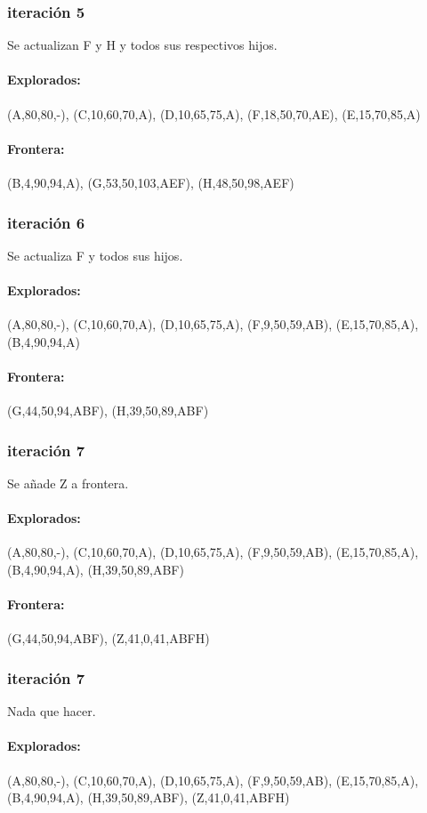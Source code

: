 \documentclass[a4paper,10pt]{article}
\begin{document}
\subsubsection{iteración 5}
Se actualizan F y H y todos sus respectivos hijos.
\paragraph{Explorados:}(A,80,80,-), (C,10,60,70,A), (D,10,65,75,A), (F,18,50,70,AE), (E,15,70,85,A)
\paragraph{Frontera:}(B,4,90,94,A), (G,53,50,103,AEF), (H,48,50,98,AEF)

\subsubsection{iteración 6}
Se actualiza F y todos sus hijos.
\paragraph{Explorados:}(A,80,80,-), (C,10,60,70,A), (D,10,65,75,A), (F,9,50,59,AB), (E,15,70,85,A), (B,4,90,94,A)
\paragraph{Frontera:}(G,44,50,94,ABF), (H,39,50,89,ABF)

\subsubsection{iteración 7}
Se añade Z a frontera.
\paragraph{Explorados:}(A,80,80,-), (C,10,60,70,A), (D,10,65,75,A), (F,9,50,59,AB), (E,15,70,85,A), (B,4,90,94,A), (H,39,50,89,ABF)
\paragraph{Frontera:}(G,44,50,94,ABF), (Z,41,0,41,ABFH)

\subsubsection{iteración 7}
Nada que hacer.
\paragraph{Explorados:}(A,80,80,-), (C,10,60,70,A), (D,10,65,75,A), (F,9,50,59,AB), (E,15,70,85,A), (B,4,90,94,A), (H,39,50,89,ABF), (Z,41,0,41,ABFH)
\end{document}
